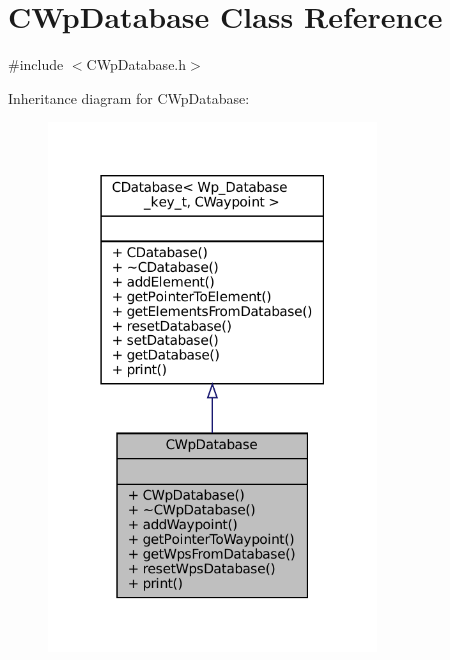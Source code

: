 \hypertarget{classCWpDatabase}{}\section{C\+Wp\+Database Class Reference}
\label{classCWpDatabase}


{\ttfamily \#include $<$C\+Wp\+Database.\+h$>$}



Inheritance diagram for C\+Wp\+Database\+:
\nopagebreak
\begin{figure}[H]
\begin{center}
\leavevmode
\includegraphics[width=247pt]{classCWpDatabase__inherit__graph}
\end{center}
\end{figure}


